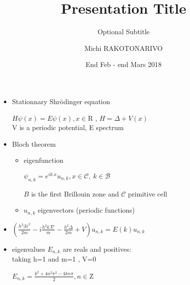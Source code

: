 \documentclass{beamer}
\title{Presentation Title}
\subtitle{Optional Subtitle}
\author{Michi RAKOTONARIVO}
\institute[Universities of Somewhere and Elsewhere] %
{
  LJK EDP
}
\date{End Feb  -  end Mars 2018}
\begin{document}
\begin{frame}
  \titlepage 
\end{frame}


\begin{frame}{}
\begin{itemize}
   \item  Stationnary Shr\"odinger equation 
    \begin{center}
       $ H \psi(x) = E \psi(x) , x  \in \mathrm{R}$ ,
       $H= \Delta + V(x) $  \\
       V is a periodic potential, E spectrum
    \end{center}
    
    \item Bloch theorem 
        \begin{itemize}
            \item  eigenfunction 
                \begin{center}
                    $\psi_{n,k} = e^{ik.x} u_{n,k} , x \in \mathcal{C} , \ k \in \mathcal{B}$ 
                \end{center}
                $B$ is the first Brillouin zone and $\mathcal{C}$ primitive cell
            \item  $u_{n,k}$ eigenvectors (periodic functions)
    
                
        \end{itemize}
    
    \item 

    $ ( \frac{h^2 |k|^2 }{2m} - i \frac{h^2 k. \nabla }{m} - \frac{h^2 \Delta }{2m} + V) u_{n,k}  = E(k) u_{n,k}$

\end{itemize}
\end{frame}

\begin{frame}
\begin{itemize}
    \item eigenvalues $E_{n,k}$ are reals and positives: \\
    taking h=1 and  m=1 , V=0 
    ~~\\
    \begin{center}
        $E_{n,k} = \frac{k^2 + 4n^2 \pi^2 - 4kn\pi}{2}, n \in \mathrm{Z}$
    \end{center}
\end{itemize}
\end{frame}
\end{document}

